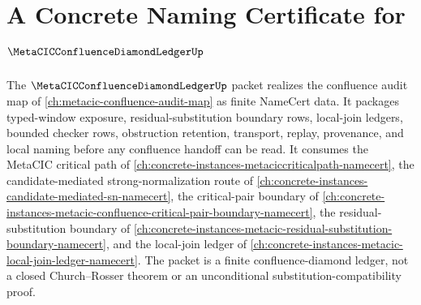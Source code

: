 \chapter{A Concrete Naming Certificate for $\MetaCICConfluenceDiamondLedgerUp$}
\label{ch:concrete-instances-metacic-confluence-diamond-ledger-namecert}

The $\MetaCICConfluenceDiamondLedgerUp$ packet realizes the confluence audit map of \autoref{ch:metacic-confluence-audit-map} as finite NameCert data. It packages typed-window exposure, residual-substitution boundary rows, local-join ledgers, bounded checker rows, obstruction retention, transport, replay, provenance, and local naming before any confluence handoff can be read. It consumes the MetaCIC critical path of \autoref{ch:concrete-instances-metaciccriticalpath-namecert}, the candidate-mediated strong-normalization route of \autoref{ch:concrete-instances-candidate-mediated-sn-namecert}, the critical-pair boundary of \autoref{ch:concrete-instances-metacic-confluence-critical-pair-boundary-namecert}, the residual-substitution boundary of \autoref{ch:concrete-instances-metacic-residual-substitution-boundary-namecert}, and the local-join ledger of \autoref{ch:concrete-instances-metacic-local-join-ledger-namecert}. The packet is a finite confluence-diamond ledger, not a closed Church--Rosser theorem or an unconditional substitution-compatibility proof.


